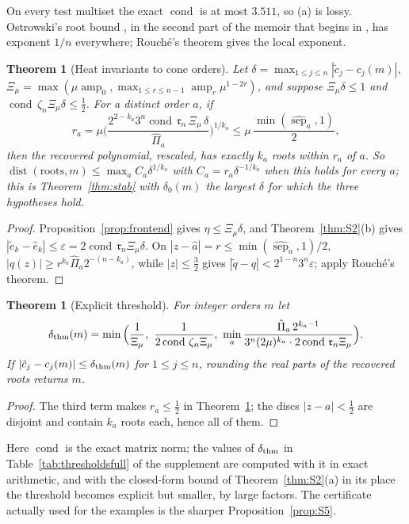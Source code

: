 \documentclass[pdflatex,sn-mathphys-num]{sn-jnl}
\newcommand{\cond}{\operatorname{cond}}
\newcommand{\amp}{\operatorname{amp}}
\newcommand{\sepn}{\operatorname{sep}}
\newcommand{\dist}{\operatorname{dist}}
\theoremstyle{thmstyleone}%
\newtheorem{theorem}[proposition]{Theorem}%
\theoremstyle{thmstylethree}%
\providecommand{\cond}{\operatorname{cond}}
\providecommand{\amp}{\operatorname{amp}}
\providecommand{\dist}{\operatorname{dist}}
\providecommand{\sepn}{\operatorname{sep}}
\begin{document}
On every test multiset the exact $\cond$ is at most $3.511$, so (a) is lossy. Ostrowski's root bound \cite[Th\'eor\`eme~XXX, (71,1)]{ostrowski1940}, in the second part of the memoir that begins in \cite{ostrowski1940a}, has exponent $1/n$ everywhere; Rouch\'e's theorem gives the local exponent.

\begin{theorem}[Heat invariants to cone orders]\label{thm:S3}
Let $\delta=\max_{1\le j\le n}|\tilde c_j-c_j(m)|$, $\Xi_\mu=\max(\mu\amp_0,\max_{1\le r\le n-1}\amp_r\mu^{1-2r})$, and suppose $\Xi_\mu\delta\le1$ and $\cond\,\zeta_n\Xi_\mu\delta\le\frac12$. For a distinct order $a$, if
\[
  r_a=\mu\Big(\frac{2^{2-k_a}3^n\cond\,\mathfrak r_n\,\Xi_\mu\,\delta}{\hat\Pi_a}\Big)^{1/k_a}\le\mu\,\frac{\min(\widehat{\sepn}_a,1)}2,
\]
then the recovered polynomial, rescaled, has exactly $k_a$ roots within $r_a$ of $a$. So $\dist(\text{roots},m)\le\max_aC_a\delta^{1/k_a}$ with $C_a=r_a\delta^{-1/k_a}$ when this holds for every $a$; this is Theorem~\ref{thm:stab} with $\delta_0(m)$ the largest $\delta$ for which the three hypotheses hold.
\end{theorem}

\begin{proof}
Proposition~\ref{prop:frontend} gives $\eta\le\Xi_\mu\delta$, and Theorem~\ref{thm:S2}(b) gives $|\tilde e_k-\hat e_k|\le\varepsilon=2\cond\,\mathfrak r_n\Xi_\mu\delta$. On $|z-\hat a|=r\le\min(\widehat{\sepn}_a,1)/2$, $|q(z)|\ge r^{k_a}\hat\Pi_a2^{-(n-k_a)}$, while $|z|\le\frac32$ gives $|\tilde q-q|<2^{1-n}3^n\varepsilon$; apply Rouch\'e's theorem.
\end{proof}

\begin{theorem}[Explicit threshold]\label{thm:S4}
For integer orders $m$ let
\[
  \delta_{\rm thm}(m)=\min\Big(\frac1{\Xi_\mu},\ \frac1{2\cond\,\zeta_n\Xi_\mu},\ \min_a\frac{\hat\Pi_a\,2^{k_a-1}}{3^n(2\mu)^{k_a}\cdot2\cond\,\mathfrak r_n\Xi_\mu}\Big).
\]
If $|\tilde c_j-c_j(m)|\le\delta_{\rm thm}(m)$ for $1\le j\le n$, rounding the real parts of the recovered roots returns $m$.
\end{theorem}

\begin{proof}
The third term makes $r_a\le\frac12$ in Theorem~\ref{thm:S3}; the discs $|z-a|<\frac12$ are disjoint and contain $k_a$ roots each, hence all of them.
\end{proof}

Here $\cond$ is the exact matrix norm; the values of $\delta_{\rm thm}$ in Table~\ref{tab:thresholdsfull} of the supplement are computed with it in exact arithmetic, and with the closed-form bound of Theorem~\ref{thm:S2}(a) in its place the threshold becomes explicit but smaller, by large factors. The certificate actually used for the examples is the sharper Proposition~\ref{prop:S5}.
\end{document}
